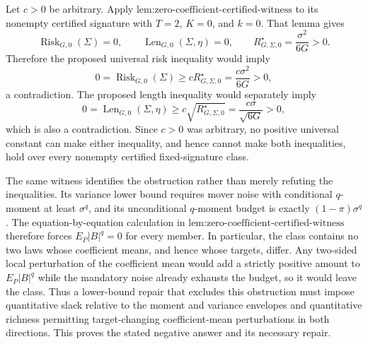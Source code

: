 Let \(c>0\) be arbitrary. Apply \(\text{lem:zero-coefficient-certified-witness}\) to its nonempty certified signature with \(T=2\), \(K=0\), and \(k=0\). That lemma gives
\[
 \operatorname{Risk}_{G,0}(\Sigma)=0,
 \qquad
 \operatorname{Len}_{G,0}(\Sigma,\eta)=0,
 \qquad
 R_{G,\Sigma,0}^{\star}=\frac{\sigma^2}{6G}>0.
\]
Therefore the proposed universal risk inequality would imply
\[
 0=\operatorname{Risk}_{G,0}(\Sigma)
 \ge cR_{G,\Sigma,0}^{\star}
 =\frac{c\sigma^2}{6G}>0,
\]
a contradiction. The proposed length inequality would separately imply
\[
 0=\operatorname{Len}_{G,0}(\Sigma,\eta)
 \ge c\sqrt{R_{G,\Sigma,0}^{\star}}
 =\frac{c\sigma}{\sqrt{6G}}>0,
\]
which is also a contradiction. Since \(c>0\) was arbitrary, no positive universal constant can make either inequality, and hence cannot make both inequalities, hold over every nonempty certified fixed-signature class.

The same witness identifies the obstruction rather than merely refuting the inequalities. Its variance lower bound requires mover noise with conditional \(q\)-moment at least \(\sigma^q\), and its unconditional \(q\)-moment budget is exactly \((1-\pi)\sigma^q\). The equation-by-equation calculation in \(\text{lem:zero-coefficient-certified-witness}\) therefore forces \(E_P|B|^q=0\) for every member. In particular, the class contains no two laws whose coefficient means, and hence whose targets, differ. Any two-sided local perturbation of the coefficient mean would add a strictly positive amount to \(E_P|B|^q\) while the mandatory noise already exhausts the budget, so it would leave the class. Thus a lower-bound repair that excludes this obstruction must impose quantitative slack relative to the moment and variance envelopes and quantitative richness permitting target-changing coefficient-mean perturbations in both directions. This proves the stated negative answer and its necessary repair.